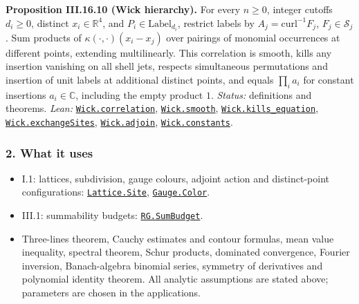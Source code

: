 \documentclass[
  letterpaper,
  11pt]{article}
\providecommand{\tightlist}{%
  \setlength{\itemsep}{0pt}\setlength{\parskip}{0pt}}
\begin{document}
\textbf{Proposition III.16.10 (Wick hierarchy).} For every \(n\ge0\),
integer cutoffs \(d_i\ge0\), distinct \(x_i\in\mathbb R^4\), and
\(P_i\in\mathrm{Label}_{d_i}\), restrict labels by
\(A_j=\mathrm{curl}^{-1}F_j\), \(F_j\in\mathcal S_j\). Sum products of
\(\kappa(\cdot,\cdot)(x_i-x_j)\) over pairings of monomial occurrences
at different points, extending multilinearly. This correlation is
smooth, kills any insertion vanishing on all shell jets, respects
simultaneous permutations and insertion of unit labels at additional
distinct points, and equals \(\prod_i a_i\) for constant insertions
\(a_i\in\mathbb C\), including the empty product \(1\). \emph{Status:}
definitions and theorems. \emph{Lean:}
\href{https://github.com/yang-mills-group/OpenAI-YM-20261028/blob/3456e5e75cf8d4cd558955a5c7638fba2d68f464/YM/Maxwell/Wick.lean\#L145-L147}{\texttt{Wick.correlation}},
\href{https://github.com/yang-mills-group/OpenAI-YM-20261028/blob/3456e5e75cf8d4cd558955a5c7638fba2d68f464/YM/Maxwell/Wick.lean\#L152-L154}{\texttt{Wick.smooth}},
\href{https://github.com/yang-mills-group/OpenAI-YM-20261028/blob/3456e5e75cf8d4cd558955a5c7638fba2d68f464/YM/Maxwell/Wick.lean\#L149-L150}{\texttt{Wick.kills\_equation}},
\href{https://github.com/yang-mills-group/OpenAI-YM-20261028/blob/3456e5e75cf8d4cd558955a5c7638fba2d68f464/YM/Maxwell/Reorder.lean\#L112-L124}{\texttt{Wick.exchangeSites}},
\href{https://github.com/yang-mills-group/OpenAI-YM-20261028/blob/3456e5e75cf8d4cd558955a5c7638fba2d68f464/YM/Maxwell/Reorder.lean\#L126-L144}{\texttt{Wick.adjoin}},
\href{https://github.com/yang-mills-group/OpenAI-YM-20261028/blob/3456e5e75cf8d4cd558955a5c7638fba2d68f464/YM/Maxwell/Reorder.lean\#L146-L153}{\texttt{Wick.constants}}.

\subsubsection{2. What it uses}\label{what-it-uses-18}

\begin{itemize}
\tightlist
\item
  I.1: lattices, subdivision, gauge colours, adjoint action and
  distinct-point configurations:
  \href{https://github.com/yang-mills-group/OpenAI-YM-20261028/blob/3456e5e75cf8d4cd558955a5c7638fba2d68f464/YM/Lattice/Site.lean\#L19}{\texttt{Lattice.Site}},
  \href{https://github.com/yang-mills-group/OpenAI-YM-20261028/blob/3456e5e75cf8d4cd558955a5c7638fba2d68f464/YM/Gauge/Colors.lean\#L43}{\texttt{Gauge.Color}}.
\item
  III.1: summability budgets:
  \href{https://github.com/yang-mills-group/OpenAI-YM-20261028/blob/3456e5e75cf8d4cd558955a5c7638fba2d68f464/YM/RG/Activities.lean\#L59-L60}{\texttt{RG.SumBudget}}.
\item
  Three-lines theorem, Cauchy estimates and contour formulas, mean value
  inequality, spectral theorem, Schur products, dominated convergence,
  Fourier inversion, Banach-algebra binomial series, symmetry of
  derivatives and polynomial identity theorem. All analytic assumptions
  are stated above; parameters are chosen in the applications.
\end{itemize}
\end{document}
